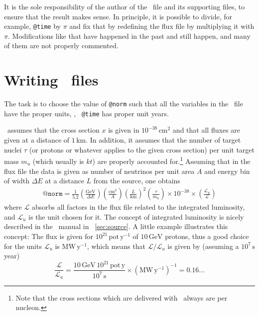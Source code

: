 It is the sole responsibility of the author of the \AEDL\ file and its
supporting files, to ensure that the result makes sense. In
principle, it is possible to divide, for example, {\tt @time}  by
$\pi$ and fix that by redefining the flux file by multiplying
it with $\pi$. Modifications like that have happened in the past
and still happen, and many of them are not properly commented.
 
\section*{Writing \AEDL\ files}

The task is to choose the value of  {\tt @norm} such that all the
variables in the \AEDL\ file have the proper units, \eg , {\tt
  @time} has proper unit years.

\GLOBES\ assumes that the cross
section $x$ is given in $10^{-38}\,\mathrm{cm}^2$ and that all fluxes are
given at a distance of $1\,\mathrm{km}$. In addition, it assumes that
the number of target nuclei $\tau$ (or protons or whatever applies to the
given cross section) per unit target mass $m_u$ (which usually is $kt$)
 are properly accounted for.\footnote{Note that the cross sections which are delivered with
  \GLOBES\ always are per nucleon.}  Assuming that in the flux file
the data is given as number of neutrinos per unit area $A$ and
energy bin of width $\Delta E$ at a distance $L$ from the source, one
obtains
\begin{eqnarray}
\mathtt{@norm}=\frac{1}{5.2}\left(\frac{\mathrm{GeV}}{\Delta
      E}\right)
\left(\frac{\mathrm{cm}^2}{A}\right)\left(\frac{L}{\mathrm{km}}\right)^2\left(\frac{\tau}{m_u}\right)\times10^{-38}\times\left(\frac{\mathcal{L}_u}{\mathcal{L}}\right)
\end{eqnarray}
where $\mathcal{L}$ absorbs all factors in the flux file related to
the integrated luminosity, and $\mathcal{L}_u$ is the unit chosen for
it.  The concept of integrated luminosity is
nicely described in the \GLOBES\ manual in \Sec~\ref{sec:source}.
A little example illustrates this concept:
The flux is given for $10^{21}\, \mathrm{pot}\,\mathrm{y}^{-1}$ of
$10\,\mathrm{GeV}$ protons, thus a good choice for the units $\mathcal{L}_u$
is $\mathrm{MW}\,\mathrm{y}^{-1}$, which means that
$\mathcal{L}/\mathcal{L}_u$ is given by (assuming a $10^7\,\mathrm{s}$
year)
\begin{equation}
\frac{\mathcal{L}}{\mathcal{L}_u}=\frac{10\,\mathrm{GeV}\,10^{21}\,\mathrm{pot}\,\mathrm{y}}{10^7\,\mathrm{s}}\times(\mathrm{MW}\,\mathrm{y}^{-1})^{-1}=0.16\ldots
\end{equation}

